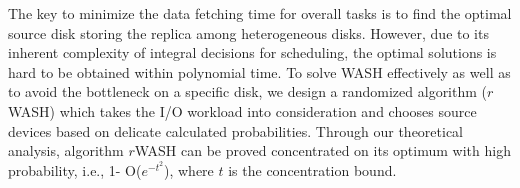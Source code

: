 \documentclass[conference]{IEEEtran}
\begin{document}
The key to minimize the data fetching time for overall tasks is to find the optimal source disk storing the replica among heterogeneous disks. However, due to its inherent complexity of integral decisions for scheduling, the optimal solutions is hard to be obtained within polynomial time. 
To solve WASH effectively as well as to avoid the bottleneck on a specific disk, we design a randomized algorithm ($r$WASH) which takes the I/O workload into consideration and chooses source devices based on delicate calculated probabilities. Through our theoretical analysis, algorithm $r$WASH can be proved concentrated on its optimum with high probability, i.e., 1- O($e^{-t^2}$), where $t$ is the concentration bound.
\end{document}
